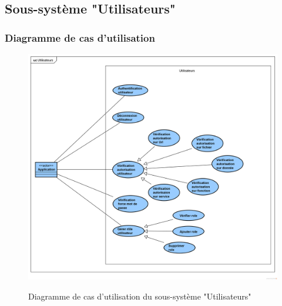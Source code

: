 \subsection{Sous-système "Utilisateurs"}

\subsubsection{Diagramme de cas d'utilisation}
\begin{figure}[H]
	\centering
	\begin{minipage}{18cm}
		\centering
		{\includegraphics[height=0.35\textheight]{fig/Utilisateurs-use-case-diagram.png}}
	\end{minipage}
	\caption{Diagramme de cas d'utilisation du sous-système "Utilisateurs"}
	\label{fig:7.13}
\end{figure}

